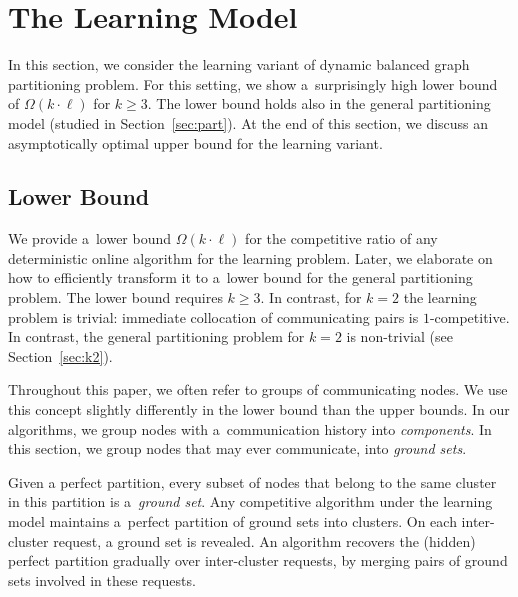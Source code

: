 \documentclass[a4paper,anonymous,USenglish]{lipics-v2019}
\begin{document}
\section{The Learning Model} %

In this section, we consider the learning variant of dynamic balanced graph partitioning problem.
For this setting, we show a~surprisingly high lower bound of $\Omega(k \cdot \ell)$ for $k\geq 3$.
The lower bound holds also in the general partitioning model (studied in Section~\ref{sec:part}).
At the end of this section, we discuss an asymptotically optimal upper bound for the learning variant.


\subsection{Lower Bound}

\label{sec:lowerbound}


We provide a~lower bound $\Omega(k\cdot \ell)$ for the competitive ratio of any deterministic online algorithm for the learning problem.
Later, we elaborate on how to efficiently transform it to a~lower bound for the general partitioning problem.
The lower bound requires $k\geq 3$.
In contrast, for $k=2$ the learning problem is trivial: immediate collocation of communicating pairs is $1$-competitive.
In contrast,
the general partitioning problem for $k=2$ is non-trivial (see Section~\ref{sec:k2}).

Throughout this paper, we often refer to groups of communicating nodes.
We use this concept slightly differently in the lower bound than the upper bounds.
In our algorithms, we group nodes with a~communication history into \emph{components}.
In this section,
we group nodes that may ever communicate, into \emph{ground sets}.



Given a perfect partition,
every subset of nodes that belong to the same cluster in this partition
is a~\emph{ground set}. 
Any competitive algorithm under the learning model
 maintains a~perfect partition of ground sets into clusters.
 On each inter-cluster request, a ground set is revealed.
 An algorithm recovers the (hidden) perfect partition gradually over inter-cluster requests,
  by merging pairs of ground sets involved in these requests.
 
\end{document}
